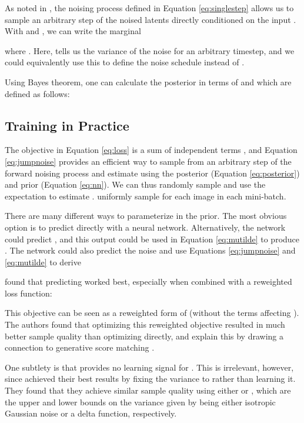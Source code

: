 \documentclass{article}
\begin{document}
As noted in \cite{ddpm}, the noising process defined in Equation \ref{eq:singlestep} allows us to sample an arbitrary step of the noised latents directly conditioned on the input . With  and , we can write the marginal

where . Here,  tells us the variance of the noise for an arbitrary timestep, and we could equivalently use this to define the noise schedule instead of .

Using Bayes theorem, one can calculate the posterior  in terms of  and  which are defined as follows:


\subsection{Training in Practice}

The objective in Equation \ref{eq:loss} is a sum of independent terms , and Equation \ref{eq:jumpnoise} provides an efficient way to sample from an arbitrary step of the forward noising process and estimate  using the posterior (Equation \ref{eq:posterior}) and prior (Equation \ref{eq:nn}). We can thus randomly sample  and use the expectation  to estimate . \citet{ddpm} uniformly sample  for each image in each mini-batch.

There are many different ways to parameterize  in the prior. The most obvious option is to predict  directly with a neural network. Alternatively, the network could predict , and this output could be used in Equation \ref{eq:mutilde} to produce . The network could also predict the noise  and use Equations \ref{eq:jumpnoise} and \ref{eq:mutilde} to derive

\citet{ddpm} found that predicting  worked best, especially when combined with a reweighted loss function:

This objective can be seen as a reweighted form of  (without the terms affecting ). The authors found that optimizing this reweighted objective resulted in much better sample quality than optimizing  directly, and explain this by drawing a connection to generative score matching \citep{scorematching,improvedscore}.

One subtlety is that  provides no learning signal for . This is irrelevant, however, since \citet{ddpm} achieved their best results by fixing the variance to  rather than learning it. They found that they achieve similar sample quality using either  or , which are the upper and lower bounds on the variance given by  being either isotropic Gaussian noise or a delta function, respectively.
\end{document}

